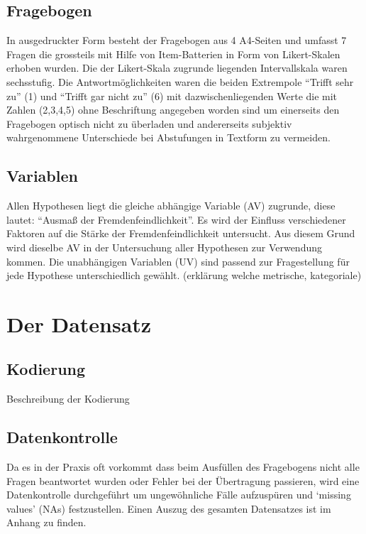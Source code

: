 \documentclass[]{article}
\begin{document}
\subsection{Fragebogen}\label{fragebogen-1}

In ausgedruckter Form besteht der Fragebogen aus 4 A4-Seiten und umfasst
7 Fragen die grossteils mit Hilfe von Item-Batterien in Form von
Likert-Skalen erhoben wurden. Die der Likert-Skala zugrunde liegenden
Intervallskala waren sechsstufig. Die Antwortmöglichkeiten waren die
beiden Extrempole ``Trifft sehr zu'' (1) und ``Trifft gar nicht zu'' (6)
mit dazwischenliegenden Werte die mit Zahlen (2,3,4,5) ohne Beschriftung
angegeben worden sind um einerseits den Fragebogen optisch nicht zu
überladen und andererseits subjektiv wahrgenommene Unterschiede bei
Abstufungen in Textform zu vermeiden.

\subsection{Variablen}\label{variablen}

Allen Hypothesen liegt die gleiche abhängige Variable (AV) zugrunde,
diese lautet: ``Ausmaß der Fremdenfeindlichkeit''. Es wird der Einfluss
verschiedener Faktoren auf die Stärke der Fremdenfeindlichkeit
untersucht. Aus diesem Grund wird dieselbe AV in der Untersuchung aller
Hypothesen zur Verwendung kommen. Die unabhängigen Variablen (UV) sind
passend zur Fragestellung für jede Hypothese unterschiedlich gewählt.
(erklärung welche metrische, kategoriale)

\section{Der Datensatz}

\subsection{Kodierung}\label{kodierung}

Beschreibung der Kodierung

\subsection{Datenkontrolle}\label{datenkontrolle}

Da es in der Praxis oft vorkommt dass beim Ausfüllen des Fragebogens
nicht alle Fragen beantwortet wurden oder Fehler bei der Übertragung
passieren, wird eine Datenkontrolle durchgeführt um ungewöhnliche Fälle
aufzuspüren und `missing values' (NAs) festzustellen. Einen Auszug des
gesamten Datensatzes ist im Anhang zu finden.
\end{document}
